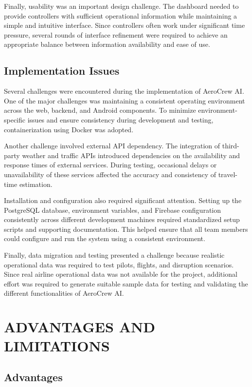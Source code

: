\documentclass[12pt,a4paper]{report}
\begin{document}
Finally, usability was an important design challenge. The dashboard needed to provide controllers with sufficient operational information while maintaining a simple and intuitive interface. Since controllers often work under significant time pressure, several rounds of interface refinement were required to achieve an appropriate balance between information availability and ease of use.

\subsection{Implementation Issues}

Several challenges were encountered during the implementation of AeroCrew AI. One of the major challenges was maintaining a consistent operating environment across the web, backend, and Android components. To minimize environment-specific issues and ensure consistency during development and testing, containerization using Docker was adopted.

Another challenge involved external API dependency. The integration of third-party weather and traffic APIs introduced dependencies on the availability and response times of external services. During testing, occasional delays or unavailability of these services affected the accuracy and consistency of travel-time estimation.

Installation and configuration also required significant attention. Setting up the PostgreSQL database, environment variables, and Firebase configuration consistently across different development machines required standardized setup scripts and supporting documentation. This helped ensure that all team members could configure and run the system using a consistent environment.

Finally, data migration and testing presented a challenge because realistic operational data was required to test pilots, flights, and disruption scenarios. Since real airline operational data was not available for the project, additional effort was required to generate suitable sample data for testing and validating the different functionalities of AeroCrew AI.



\section{ADVANTAGES AND LIMITATIONS}

\subsection{Advantages}
\end{document}
